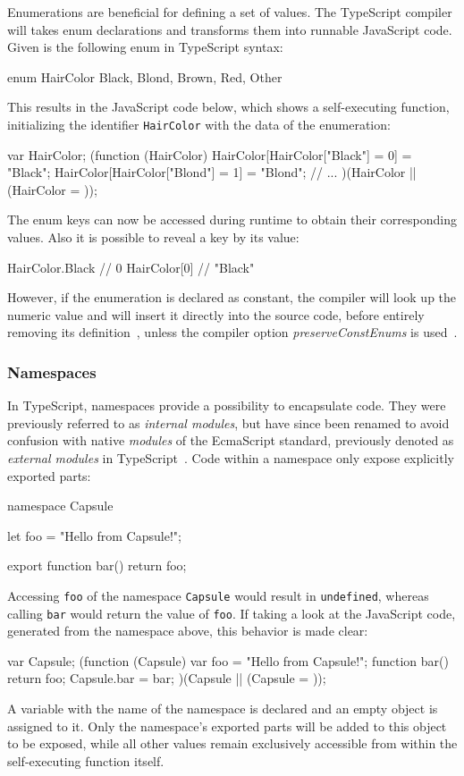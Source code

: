 Enumerations are beneficial for defining a set of values. The TypeScript compiler will takes enum declarations and transforms them into runnable JavaScript code. Given is the following enum in TypeScript syntax:
\begin{JsCode}[numbers=none]
enum HairColor {
  Black, Blond, Brown, Red, Other
}
\end{JsCode}
This results in the JavaScript code below, which shows a self-executing function, initializing the identifier \texttt{HairColor} with the data of the enumeration:
\begin{JsCode}[numbers=none]
var HairColor;
(function (HairColor) {
    HairColor[HairColor["Black"] = 0] = "Black";
    HairColor[HairColor["Blond"] = 1] = "Blond";
    // ...
})(HairColor || (HairColor = {}));
\end{JsCode}
The enum keys can now be accessed during runtime to obtain their corresponding values. Also it is possible to reveal a key by its value:
\begin{JsCode}[numbers=none]
HairColor.Black // 0
HairColor[0] // "Black"
\end{JsCode}
However, if the enumeration is declared as constant, the compiler will look up the numeric value and will insert it directly into the source code, before entirely removing its definition~\cite{TypeScriptHandbook:Enums}, unless the compiler option \emph{preserveConstEnums} is used~\cite{TypeScriptHandbook:CompilerOptions}.

\subsubsection{Namespaces}
\label{sec:ts-namespaces}

In TypeScript, namespaces provide a possibility to encapsulate code. They were previously referred to as \emph{internal modules}, but have since been renamed to avoid confusion with native \emph{modules} of the EcmaScript standard, previously denoted as \emph{external modules} in TypeScript~\cite{TypeScriptHandbook:Namespaces}. Code within a namespace only expose explicitly exported parts:
\begin{JsCode}[numbers=none]
namespace Capsule {
  let foo = "Hello from Capsule!";
  
  export function bar() {
    return foo;
  }
}
\end{JsCode}
Accessing \texttt{foo} of the namespace \texttt{Capsule} would result in \texttt{undefined}, whereas calling \texttt{bar} would return the value of \texttt{foo}. If taking a look at the JavaScript code, generated from the namespace above, this behavior is made clear:
\begin{JsCode}[numbers=none]
var Capsule;
(function (Capsule) {
    var foo = "Hello from Capsule!";
    function bar() {
        return foo;
    }
    Capsule.bar = bar;
})(Capsule || (Capsule = {}));
\end{JsCode}
A variable with the name of the namespace is declared and an empty object is assigned to it. Only the namespace's exported parts will be added to this object to be exposed, while all other values 
remain exclusively accessible from within the self-executing function itself.

